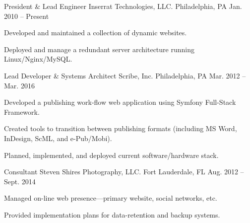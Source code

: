 


\begin{listSection}

    \listEntry
        {President \& Lead Engineer}
        {Inserrat Technologies, LLC.}
        {Philadelphia, PA}
        {Jan. 2010 -- Present}
        {
            \begin{listGroupSection}
                \item {Developed and maintained a collection of dynamic websites.}
                \item {Deployed and manage a redundant server architecture running Linux/Nginx/MySQL.}
            \end{listGroupSection}
        }

    \listEntry
        {Lead Developer \& Systems Architect}
        {Scribe, Inc.}
        {Philadelphia, PA}
        {Mar. 2012 -- Mar. 2016}
        {
            \begin{listGroupSection}
                \item {Developed a publishing work-flow web application using Symfony Full-Stack Framework.}
                \item {Created tools to transition between publishing formats (including MS Word, InDesign, ScML, and e-Pub/Mobi).}
                \item {Planned, implemented, and deployed current software/hardware stack.}
            \end{listGroupSection}
        }

    \listEntry
        {Consultant}
        {Steven Shires Photography, LLC.}
        {Fort Lauderdale, FL}
        {Aug. 2012 -- Sept. 2014}
        {
            \begin{listGroupSection}
                \item {Managed on-line web presence---primary website, social networks, etc.}
                \item {Provided implementation plans for data-retention and backup systems.}
            \end{listGroupSection}
        }


\end{listSection}
